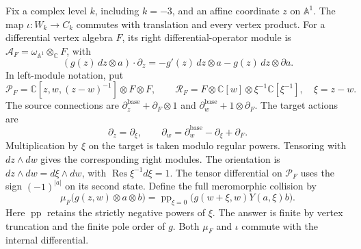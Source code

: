Fix a complex level $k$, including $k=-3$, and an affine coordinate $z$ on $\mathbb A^1$.
The map $\iota:W_k\to C_k$ commutes with translation and every vertex product.
For a differential vertex algebra $F$, its right differential-operator module is
$\mathcal A_F=\omega_{\mathbb A^1}\otimes_{\mathbb C}F$, with
\[
 (g(z)\,dz\otimes a)\cdot\partial_z
 =-g'(z)\,dz\otimes a-g(z)\,dz\otimes\partial a.
\]
In left-module notation, put
\[
 \mathcal P_F=\mathbb C[z,w,(z-w)^{-1}]\otimes F\otimes F,
 \qquad
 \mathcal R_F=F\otimes\mathbb C[w]\otimes \xi^{-1}\mathbb C[\xi^{-1}],
 \quad \xi=z-w.
\]
The source connections are $\partial_z^{\mathrm{base}}+\partial_F\otimes1$ and
$\partial_w^{\mathrm{base}}+1\otimes\partial_F$.
The target actions are
\[
 \partial_z=\partial_\xi,\qquad
 \partial_w=\partial_w^{\mathrm{base}}-\partial_\xi+\partial_F.
\]
Multiplication by $\xi$ on the target is taken modulo regular powers.
Tensoring with $dz\wedge dw$ gives the corresponding right modules.
The orientation is $dz\wedge dw=d\xi\wedge dw$, with $\operatorname{Res}\xi^{-1}d\xi=1$.
The tensor differential on $\mathcal P_F$ uses the sign $(-1)^{|a|}$ on its second state.
Define the full meromorphic collision by
\[
 \mu_F\bigl(g(z,w)\otimes a\otimes b\bigr)
 =\operatorname{pp}_{\xi=0}\bigl(g(w+\xi,w)Y(a,\xi)b\bigr).
\]
Here $\operatorname{pp}$ retains the strictly negative powers of $\xi$.
The answer is finite by vertex truncation and the finite pole order of $g$.
Both $\mu_F$ and $\iota$ commute with the internal differential.

